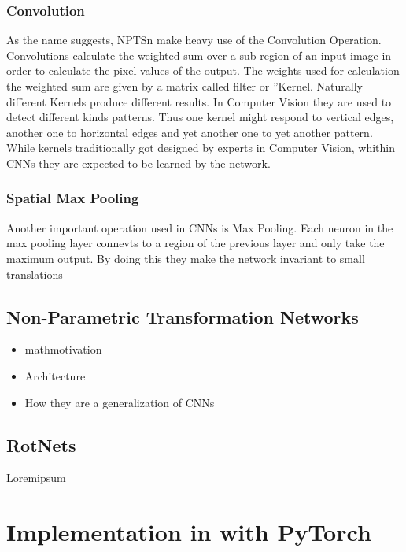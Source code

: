 \documentclass{llncs}
\begin{document}
\subsubsection{Convolution}
As the name suggests, NPTSn make heavy use of the Convolution Operation. Convolutions calculate the weighted sum over a sub region of an input image in order to calculate the pixel-values of the output. The weights used for calculation the weighted sum are given by a matrix called filter or ”Kernel. Naturally different Kernels produce different results. In Computer Vision they are used to detect different kinds patterns. Thus one kernel might respond to vertical edges, another  one to horizontal edges and yet another one to yet another pattern. While kernels traditionally got designed by experts in Computer Vision, whithin CNNs they are expected to be learned by the network.
\subsubsection{Spatial Max Pooling}
Another important operation used in CNNs is Max Pooling.
Each neuron in the max pooling layer connevts to a region of the previous
layer and only take the maximum output. By doing this they make the network
invariant to small translations

\subsection{Non-Parametric Transformation Networks}
\begin{itemize}
  \item	mathmotivation
  \item Architecture
  \item How they are a generalization of CNNs
\end{itemize}

\subsection{RotNets}
Loremipsum

\section{Implementation in with PyTorch}
\end{document}
